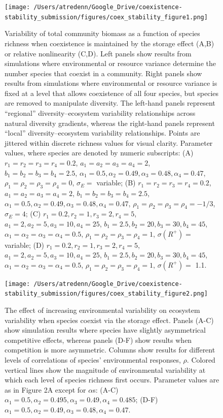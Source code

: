 \documentclass[12pt,]{article}
\begin{document}
\begin{figure}[!ht]
  \centering
      \texttt{[image: /Users/atredenn/Google\_Drive/coexistence-stability\_submission/figures/coex\_stability\_figure1.png]}
  \caption{Variability of total community biomass as a function of species richness when coexistence is maintained by the storage effect (A,B) or relative nonlinearity (C,D). Left panels show results from simulations where environmental or resource variance determine the number species that coexist in a community. Right panels show results from simulations where environmental or resource variance is fixed at a level that allows coexistence of all four species, but species are removed to manipulate diversity. The left-hand panels represent ``regional'' diversity--ecosystem variability relationships across natural diversity gradients, whereas the right-hand panels represent ``local'' diversity--ecosystem variability relationships.  Points are jittered within discrete richness values for visual clarity. Parameter values, where species are denoted by numeric subscripts: (A) $r_1 = r_2 = r_3 = r_4 = 0.2$, $a_1 = a_2 = a_3 = a_4 = 2$, $b_1 = b_2 = b_3 = b_4 = 2.5$, $\alpha_1 = 0.5, \alpha_2 = 0.49, \alpha_3 = 0.48, \alpha_4 = 0.47$, $\rho_1 = \rho_2 = \rho_3 = \rho_4 = 0$, $\sigma_E =$ variable; (B) $r_1 = r_2 = r_3 = r_4 = 0.2$, $a_1 = a_2 = a_3 = a_4 = 2$, $b_1 = b_2 = b_3 = b_4 = 2.5$, $\alpha_1 = 0.5, \alpha_2 = 0.49, \alpha_3 = 0.48, \alpha_4 = 0.47$, $\rho_1 = \rho_2 = \rho_3 = \rho_4 = -1/3$, $\sigma_E = 4$; (C) $r_1 = 0.2, r_2 = 1, r_3 = 2, r_4 = 5$, $a_1 = 2, a_2 = 5, a_3 = 10, a_4 = 25$, $b_1 = 2.5, b_2 = 20, b_3 = 30, b_4 = 45$, $\alpha_1 = \alpha_2 = \alpha_3 = \alpha_4 = 0.5$, $\rho_1 = \rho_2 = \rho_3 = \rho_4 = 1$, $\sigma(R^+) =$ variable; (D) $r_1 = 0.2, r_2 = 1, r_3 = 2, r_4 = 5$, $a_1 = 2, a_2 = 5, a_3 = 10, a_4 = 25$, $b_1 = 2.5, b_2 = 20, b_3 = 30, b_4 = 45$, $\alpha_1 = \alpha_2 = \alpha_3 = \alpha_4 = 0.5$, $\rho_1 = \rho_2 = \rho_3 = \rho_4 = 1$, $\sigma(R^+) =$ 1.1.}
\end{figure}

\newpage{}

\begin{figure}[!ht]
  \centering
      \texttt{[image: /Users/atredenn/Google\_Drive/coexistence-stability\_submission/figures/coex\_stability\_figure2.png]}
  \caption{The effect of increasing environmental variability on ecosystem variability when species coexist via the storage effect. Panels (A-C) show simulation results where species have slightly asymmetrical competitive effects, whereas panels (D-F) show results when competition is more asymmetric. Columns show results for different levels of correlations of species' environmental responses, $\rho$. Colored vertical lines show the magnitude of environmental variability at which each level of species richness first occurs. Parameter values are as in Figure 2A except for $\alpha$s: (A-C) $\alpha_1 = 0.5, \alpha_2 = 0.495, \alpha_3 = 0.49, \alpha_4 = 0.485$; (D-F) $\alpha_1 = 0.5, \alpha_2 = 0.49, \alpha_3 = 0.48, \alpha_4 = 0.47$.}
\end{figure}
\end{document}
